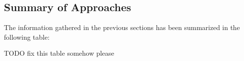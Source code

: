   \subsection{ Summary of Approaches }

  The information gathered in the previous sections has been summarized in the
  following table:

  TODO fix this table somehow please

